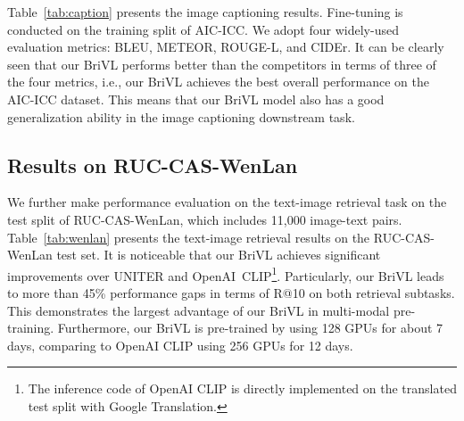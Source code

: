 \documentclass[10pt,twocolumn,letterpaper]{article}
\begin{document}
Table~\ref{tab:caption} presents the image captioning results. Fine-tuning is conducted on the training split of AIC-ICC. We adopt four widely-used evaluation metrics: BLEU, METEOR, ROUGE-L, and CIDEr. It can be clearly seen that our BriVL performs better than the competitors in terms of three of the four metrics, i.e., our BriVL achieves the best overall performance on the AIC-ICC dataset. This means that our BriVL model also has a good generalization ability in the image captioning downstream task.

\begin{table}[t]
    \centering
    \caption{Evaluation results for the text-image retrieval downstream task on the RUC-CAS-WenLan test set.}
    \vspace{0.03in}
    \label{tab:wenlan}
    \footnotesize
\end{table}

\subsection{Results on RUC-CAS-WenLan}
\label{sec:expwenlan}

We further make performance evaluation on the text-image retrieval task on the test split of RUC-CAS-WenLan, which includes 11,000 image-text pairs. Table~\ref{tab:wenlan} presents the text-image retrieval results on the RUC-CAS-WenLan test set. It is noticeable that our BriVL achieves significant improvements over UNITER and OpenAI~CLIP\footnote{The inference code of OpenAI CLIP is directly implemented on the translated test split with Google Translation.}. Particularly, our BriVL leads to more than 45\% performance gaps in terms of R@10 on both retrieval subtasks. This demonstrates the largest advantage of our BriVL in multi-modal pre-training. Furthermore, our BriVL is pre-trained by using 128 GPUs for about 7 days, comparing to OpenAI CLIP using 256 GPUs for 12 days.
\end{document}
